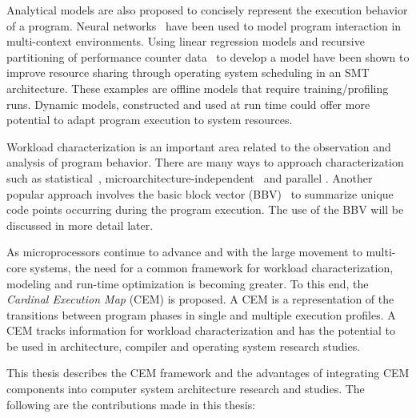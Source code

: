 Analytical models are also proposed to concisely represent the
execution behavior of a program.
Neural networks~\cite{josh-thesis} have been used to model program interaction in
multi-context environments. Using
linear regression models and recursive partitioning of performance
counter data~\cite{model-2} to develop a model have been shown to improve resource
sharing through operating system scheduling in an SMT~\cite{SMT}
architecture. These examples are offline models that
require training/profiling runs. Dynamic models, constructed and used
at run time could offer more potential to adapt program execution
to system resources.

Workload characterization is an important area related to the
observation and analysis of program behavior. There are many ways
to approach characterization such as statistical~\cite{workload-1},
microarchitecture-independent~\cite{workload-2} and parallel
\cite{workload-3, workload-4}. Another popular approach involves the
basic block vector (BBV)~\cite{bbv-1, bbv-2} to summarize unique code points
occurring during the program execution. The use of the BBV
will be discussed in more detail later.

As microprocessors continue to advance and with the large movement to multi-core
systems, the need for a common framework for workload
characterization, modeling and run-time optimization is becoming
greater. To this end, the \textit{Cardinal Execution Map} (CEM) is
proposed. A CEM is a representation of the transitions between
program phases in single and multiple execution profiles. A CEM tracks
information for workload characterization and has the potential to be used in
architecture, compiler and operating system research studies.

This thesis describes the CEM framework and the advantages of integrating CEM
components into computer system architecture research and studies. The following
are the contributions made in this thesis:

